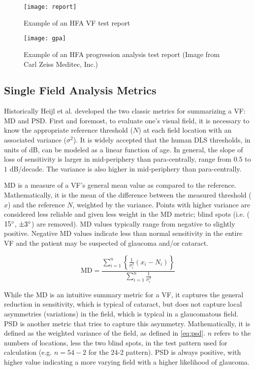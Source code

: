\begin{figure}[p]
	\texttt{[image: report]}
	\caption{Example of an \ac{HFA} \ac{VF} test report}
	\label{fig:report}
\end{figure}

\begin{figure}[p]
	\texttt{[image: gpa]}
	\caption{Example of an \ac{HFA} progression analysis test report (Image from Carl Zeiss Meditec, Inc.)}
	\label{fig:gpa}
\end{figure}

\subsection{Single Field Analysis Metrics}

Historically Heijl et al. developed the two classic metrics for summarizing a \ac{VF}: \ac{MD} and \ac{PSD}. \cite{Heijl1987} First and foremost, to evaluate one's visual field, it is necessary to know the appropriate reference threshold ($N$) at each field location with an associated variance ($\sigma^2$). It is widely accepted that the human \ac{DLS} thresholds, in units of dB, can be modeled as a linear function of age. \cite{Heijl1987a} In general, the slope of loss of sensitivity is larger in mid-periphery than para-centrally, range from $0.5$ to $1$ dB/decade. The variance is also higher in mid-periphery than para-centrally. 

\ac{MD} is a measure of a \ac{VF}'s general mean value as compared to the reference. Mathematically, it is the mean of the difference between the measured threshold ($x$) and the reference $N$, weighted by the variance. Points with higher variance are considered less reliable and given less weight in the \ac{MD} metric; blind spots (i.e. ($15\degree$, $\pm3\degree$) are removed). MD values typically range from negative to slightly positive. Negative MD values indicate less than normal sensitivity in the entire \ac{VF} and the patient may be suspected of glaucoma and/or cataract.

\begin{equation}
\textrm{MD} =\frac{ 
\sum\limits_{i=1}^{n} \left\{
\frac{1}{\sigma_{i}^2} (x_i-N_i)
\right\} }{
\sum\limits_{i=1}^{n} 
\frac{1}{\sigma_{i}^2} 
}
\end{equation}

While the \ac{MD} is an intuitive summary metric for a \ac{VF}, it captures the general reduction in sensitivity, which is typical of cataract, but does not capture local asymmetries (variations) in the field, which is typical in a glaucomatous field. \ac{PSD} is another metric that tries to capture this asymmetry. Mathematically, it is defined as the weighted variance of the field, as defined in \cref{eq:psd}. $n$ refers to the numbers of locations, less the two blind spots, in the test pattern used for calculation (e.g. $n=54-2$ for the 24-2 pattern). \ac{PSD} is always positive, with higher value indicating a more varying field with a higher likelihood of glaucoma.

